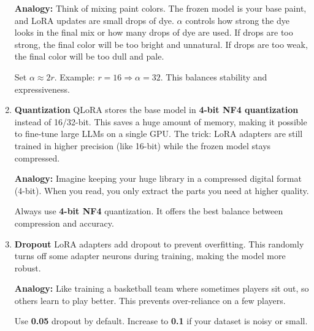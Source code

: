 \documentclass[a4paper, 12pt]{article}
\begin{document}
\begin{enumerate}
    \textbf{Analogy:} Think of mixing paint colors. The frozen model is your base paint, and LoRA updates are small drops of dye. $\alpha$ controls how strong the dye looks in the final mix or how many drops of dye are used. If drops are too strong, the final color will be too bright and unnatural. If drops are too weak, the final color will be too dull and pale.

    \begin{tcolorbox}[colback=orange!5,colframe=orange!85!black,title=Rule of Thumb]
        Set $\alpha \approx 2r$.  
        Example: $r=16 \Rightarrow \alpha=32$.  
        This balances stability and expressiveness.
    \end{tcolorbox}

    \item \textbf{Quantization}  
    QLoRA stores the base model in \textbf{4-bit NF4 quantization} instead of 16/32-bit.  
    This saves a huge amount of memory, making it possible to fine-tune large LLMs on a single GPU.  
    The trick: LoRA adapters are still trained in higher precision (like 16-bit) while the frozen model stays compressed.  

    \textbf{Analogy:} Imagine keeping your huge library in a compressed digital format (4-bit). When you read, you only extract the parts you need at higher quality.  

    \begin{tcolorbox}[colback=purple!5,colframe=purple!70!black,title=Rule of Thumb]
        Always use \textbf{4-bit NF4} quantization.  
        It offers the best balance between compression and accuracy.
    \end{tcolorbox}

    \item \textbf{Dropout}  
    LoRA adapters add dropout to prevent overfitting. This randomly turns off some adapter neurons during training, making the model more robust.  

    \textbf{Analogy:} Like training a basketball team where sometimes players sit out, so others learn to play better. This prevents over-reliance on a few players.  

    \begin{tcolorbox}[colback=red!5,colframe=red!75!black,title=Rule of Thumb]
        Use \textbf{0.05} dropout by default.  
        Increase to \textbf{0.1} if your dataset is noisy or small.
    \end{tcolorbox}
\end{enumerate}
\end{document}
